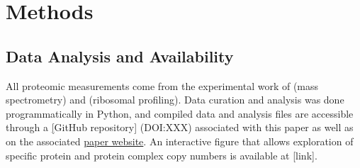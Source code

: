 \section{Methods}

\subsection{Data Analysis and Availability}
All proteomic measurements come from the experimental work of \cite{schmidt2016,
peebo2015, valgepea2013} (mass spectrometry) and \cite{li2014} (ribosomal
profiling). Data curation and analysis was done programmatically in Python, and
compiled data and analysis files are accessible through a
\href{https://github.com/rpgroup-pboc/growth_limits}[GitHub repository]
(DOI:XXX) associated with this paper as well as on the associated
\href{https://rpgroup.caltech.edu/growth_limits}{paper website}. An interactive
figure that allows exploration of specific protein and protein complex copy
numbers is available at [link].


